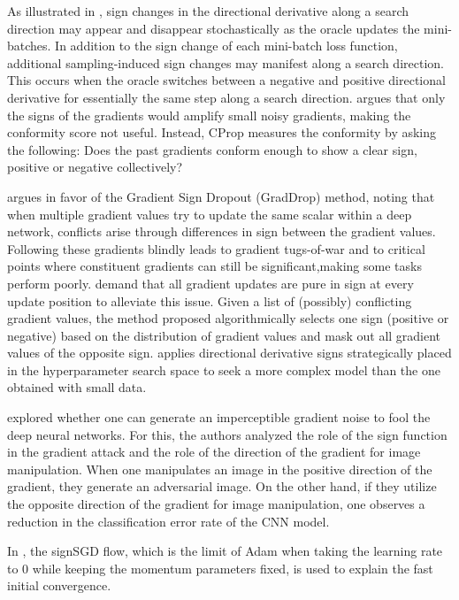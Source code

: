 \documentclass[11pt]{book}
\begin{document}
\noindent As illustrated in \cite{kafka2019traversing}, sign changes
in the directional derivative along a search direction may appear
and disappear stochastically as the oracle updates the mini-batches.
In addition to the sign change of each mini-batch loss function, additional
sampling-induced sign changes may manifest along a search direction.
This occurs when the oracle switches between a negative and positive
directional derivative for essentially the same step along a search
direction. \cite{preechakul2019cprop} argues that only the signs
of the gradients would amplify small noisy gradients, making the conformity
score not useful. Instead, CProp measures the conformity by asking
the following:\textquotedbl{} Does the past gradients conform enough
to show a clear sign, positive or negative collectively?\textquotedbl{} 

\cite{chen2020just} argues in favor of the Gradient Sign Dropout
(GradDrop) method, noting that when multiple gradient values try to
update the same scalar within a deep network, conflicts arise through
differences in sign between the gradient values. Following these gradients
blindly leads to gradient tugs-of-war and to critical points where
constituent gradients can still be significant,making some tasks perform
poorly. \cite{chen2020just} demand that all gradient updates are
pure in sign at every update position to alleviate this issue. Given
a list of (possibly) conflicting gradient values, the method proposed
algorithmically selects one sign (positive or negative) based on the
distribution of gradient values and mask out all gradient values of
the opposite sign.\cite{joy2020fast} applies directional derivative
signs strategically placed in the hyperparameter search space to seek
a more complex model than the one obtained with small data.

\cite{agarwal2020role} explored whether one can generate an imperceptible
gradient noise to fool the deep neural networks. For this, the authors
analyzed the role of the sign function in the gradient attack and
the role of the direction of the gradient for image manipulation.
When one manipulates an image in the positive direction of the gradient,
they generate an adversarial image. On the other hand, if they utilize
the opposite direction of the gradient for image manipulation, one
observes a reduction in the classification error rate of the CNN model.

In \cite{ma2020qualitative}, the signSGD flow, which is the limit
of Adam when taking the learning rate to $0$ while keeping the momentum
parameters fixed, is used to explain the fast initial convergence.
\end{document}
